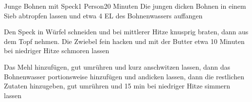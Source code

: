 \begin{recipe}{Junge Bohnen mit Speck}{1 Person}{20 Minuten}
Die jungen dicken Bohnen in einem Sieb abtropfen lassen und etwa 4 EL des Bohnenwassers auffangen

Den Speck in Würfel schneiden und bei mittlerer Hitze knusprig braten, dann aus dem Topf nehmen.
Die Zwiebel fein hacken und mit der Butter etwa 10 Minuten bei niedriger Hitze schmoren lassen

Das Mehl hinzufügen, gut umrühren und kurz anschwitzen lassen, dann das Bohnenwasser portionsweise hinzufügen und andicken lassen, dann die restlichen Zutaten hinzugeben, gut umrühren und 15 min bei niedriger Hitze simmern lassen
\end{recipe}